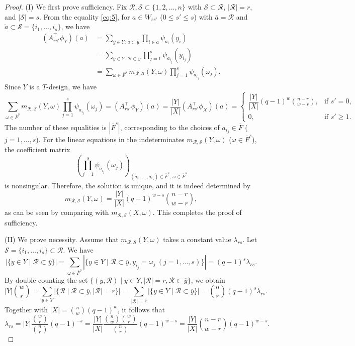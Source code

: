 \documentclass[a4paper, 11pt]{article}
\theoremstyle{definition}
\begin{document}
\begin{proof}
(I) We first prove sufficiency.  
Fix $\mathcal{R}, \mathcal{S} \subset \{1,2,\ldots,n\}$ with $\mathcal{S} \subset \mathcal{R}$, $|\mathcal{R}| = r$, and $|\mathcal{S}| = s$.  
From the equality \eqref{eq:5}, for $a \in W_{rs'}$ ($0 \le s' \le s$) with $\overline{a} = \mathcal{R}$ and $\tilde{a} \subset \mathcal{S}=\{i_1,\ldots, i_s\}$, we have
\begin{align*}
    (A_{rs'}^\top \phi_Y)(a)
    &= \sum_{y \in Y:\, \overline{a} \subset \overline{y}} \prod_{i \in \overline{a}} \psi_{a_i}(y_i)\\
    &= \sum_{y \in Y:\, \mathcal{R} \subset \overline{y}} \prod_{j =1}^s \psi_{a_{i_j}}(y_{i_j})\\
    &= \sum_{\omega \in \overline{F}^{s}} m_{\mathcal{R},\mathcal{S}}(Y,\omega) 
       \prod_{j=1}^s \psi_{a_{i_j}}(\omega_j).
\end{align*}
Since $Y$ is a $T$-design, we have
\[
\sum_{\omega \in \overline{F}^{s}} 
   m_{\mathcal{R},\mathcal{S}}(Y,\omega) 
   \prod_{j=1}^s \psi_{a_{i_j}}(\omega_j)
   = (A_{rs'}^\top \phi_Y)(a)
   = \frac{|Y|}{|X|}(A_{rs'}^\top \phi_X)(a)
   = 
   \begin{cases}
      \dfrac{|Y|}{|X|}(q-1)^{w} \binom{n-r}{w-r}, & \text{if } s' = 0,\\[6pt]
      0, & \text{if } s' \ge 1.
   \end{cases}
\]
The number of these equalities is $|\overline{F}^{s}|$, corresponding to the choices of $a_{i_j} \in \overline{F}$ ($j=1,\ldots,s$).  
For the linear equations in the indeterminates $m_{\mathcal{R},\mathcal{S}}(Y,\omega)$ ($\omega \in \overline{F}^s$),  
the coefficient matrix 
\[
\left( \prod_{j=1}^s \psi_{a_{i_j}}(\omega_j) \right)_{(a_{i_1},\ldots,a_{i_s}) \in \overline{F}^s,\, \omega \in \overline{F}^s}
\]
is nonsingular.  
Therefore, the solution is unique, and it is indeed determined by
\[
m_{\mathcal{R},\mathcal{S}}(Y,\omega)
   = \frac{|Y|}{|X|}(q-1)^{w-s} \binom{n-r}{w-r},
\]
as can be seen by comparing with $m_{\mathcal{R},\mathcal{S}}(X,\omega)$.  
This completes the proof of sufficiency.


(II) We prove necessity. 
Assume that $m_{\mathcal{R},\mathcal{S}}(Y,\omega)$ takes a constant value $\lambda_{rs}$. 
Let $\mathcal{S}=\{i_1,\ldots, i_s\}\subset \mathcal{R}$. We have 
\[
 |\{y\in Y \mid  \mathcal{R}\subset \overline{y} \}|
 = \sum_{\omega \in \overline{F}^s}|\{y \in Y \mid  \mathcal{R} \subset \overline{y}, y_{i_j}=\omega_j\ (j=1,\ldots, s)\}|=(q-1)^s \lambda_{rs}. 
\]
By double counting the set $\{(y,\mathcal{R}) \mid  y \in Y, |\mathcal{R}|=r, \mathcal{R} \subset \overline{y}\}$, we obtain 
\[
|Y|\binom{w}{r}
=\sum_{y\in Y} |\{\mathcal{R} \mid \mathcal{R}\subset \overline{y}, |\mathcal{R}|=r  \}|
=\sum_{|\mathcal{R}|=r} |\{y\in Y \mid  \mathcal{R}\subset \overline{y} \}|
=\binom{n}{r}(q-1)^s\lambda_{rs}. 
\]
Together with $|X|=\binom{n}{w}(q-1)^w$, it follows that
\[
\lambda_{rs}=|Y|\frac{\binom{w}{r}}{\binom{n}{r}}(q-1)^{-s}
=\frac{|Y|}{|X|}\frac{\binom{n}{w}\binom{w}{r}}{\binom{n}{r}}(q-1)^{w-s}
=\frac{|Y|}{|X|}\binom{n-r}{w-r}(q-1)^{w-s}. 
\]


\end{proof}
\end{document}
